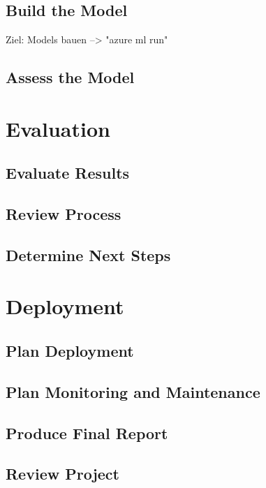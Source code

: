 \subsection{Build the Model}
Ziel: Models bauen
--> "azure ml run"

\subsection{Assess the Model}


\section{Evaluation}
\subsection{Evaluate Results}
\subsection{Review Process}
\subsection{Determine Next Steps}


\section{Deployment}
\subsection{Plan Deployment}
\subsection{Plan Monitoring and Maintenance}
\subsection{Produce Final Report}
\subsection{Review Project}


